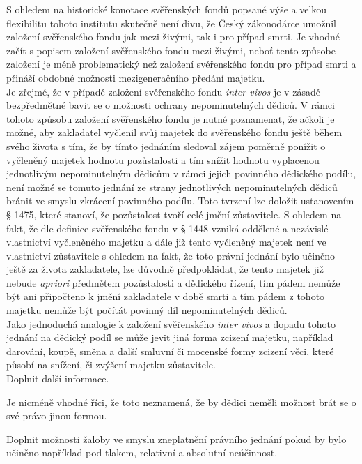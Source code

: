 \documentclass{article}
\begin{document}
S ohledem na historické konotace svěřenských fondů popsané výše a velkou flexibilitu tohoto institutu skutečně není divu, že Český zákonodárce umožnil založení svěřenského fondu jak mezi živými, tak i pro případ smrti. Je vhodné začít s popisem založení svěřenského fondu mezi živými, neboť tento způsobe založení je méně problematický než založení svěřenského fondu pro případ smrti a přináší obdobné možnosti mezigeneračního předání majetku.\\

Je zřejmé, že v případě založení svěřenského fondu \textit{inter vivos} je v zásadě bezpředmětné bavit se o možnosti ochrany nepominutelných dědiců. V rámci tohoto způsobu založení svěřenského fondu je nutné poznamenat, že ačkoli je možné, aby zakladatel vyčlenil svůj majetek do svěřenského fondu ještě během svého života s tím, že by tímto jednáním sledoval zájem poměrně ponížit o vyčleněný majetek hodnotu pozůstalosti a tím snížit hodnotu vyplacenou jednotlivým nepominutelným dědicům v rámci jejich povinného dědického podílu, není možné se tomuto jednání ze strany jednotlivých nepominutelných dědiců bránit ve smyslu zkrácení povinného podílu. Toto tvrzení lze doložit ustanovením § 1475, které stanoví, že pozůstalost tvoří celé jmění zůstavitele. S ohledem na fakt, že dle definice svěřenského fondu v § 1448 vzniká oddělené a nezávislé vlastnictví vyčleněného majetku a dále již tento vyčleněný majetek není ve vlastnictví zůstavitele s ohledem na fakt, že toto právní jednání bylo učiněno ještě za života zakladatele, lze důvodně předpokládat, že tento majetek již nebude \textit{apriori} předmětem pozůstalosti a dědického řízení, tím pádem nemůže být ani připočteno k jmění zakladatele v době smrti a tím pádem z tohoto majetku nemůže být počítát povinný díl nepominutelných dědiců.\\

Jako jednoduchá analogie k založení svěřenského \textit{inter vivos} a dopadu tohoto jednání na dědický podíl se může jevit jiná forma zcizení majetku, například darování, koupě, směna a další smluvní či mocenské formy zcizení věci, které působí na snížení, či zvýšení majetku zůstavitele. \\

Doplnit další informace.

Je nicméně vhodné říci, že toto neznamená, že by dědici neměli možnost brát se o své právo jinou formou.

Doplnit možnosti žaloby ve smyslu zneplatnění právního jednání pokud by bylo učiněno například pod tlakem, relativní a absolutní neúčinnost.
\end{document}
